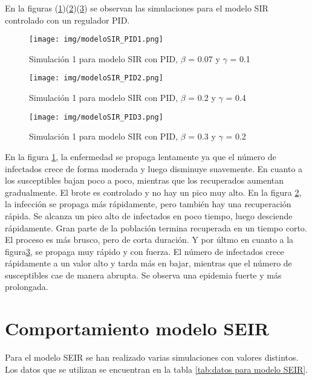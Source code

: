 En la figuras (\ref{fig:simu1pid})(\ref{fig:simu2pid})(\ref{fig:simu3pid}) se observan las simulaciones para el modelo SIR controlado con un regulador PID.

\begin{figure}[H]
    \centering
    \texttt{[image: img/modeloSIR\_PID1.png]}
    \caption{Simulación 1 para modelo SIR con PID, $\beta$ = 0.07 y $\gamma$ = 0.1}
    \label{fig:simu1pid}
    \vspace{0.5cm} %
\end{figure}

\begin{figure}[H]
    \centering
    \texttt{[image: img/modeloSIR\_PID2.png]}
    \caption{Simulación 1 para modelo SIR con PID, $\beta$ = 0.2 y $\gamma$ = 0.4}
    \label{fig:simu2pid}
    \vspace{0.5cm} %
\end{figure}

\begin{figure}[H]
    \centering
    \texttt{[image: img/modeloSIR\_PID3.png]}
    \caption{Simulación 1 para modelo SIR con PID, $\beta$ = 0.3 y $\gamma$ = 0.2}
    \label{fig:simu3pid}
    \vspace{0.5cm} %
\end{figure}

En la figura \ref{fig:simu1pid}, la enfermedad se propaga lentamente ya que el número de infectados crece de forma moderada y luego disminuye suavemente. En cuanto a los susceptibles bajan poco a poco, mientras que los recuperados aumentan gradualmente. El brote es controlado y no hay un pico muy alto. En la figura \ref{fig:simu2pid}, la infección se propaga más rápidamente, pero también hay una recuperación rápida. Se alcanza un pico alto de infectados en poco tiempo, luego desciende rápidamente.
Gran parte de la población termina recuperada en un tiempo corto. El proceso es más brusco, pero de corta duración. Y por últmo en cuanto a la figura\ref{fig:simu3pid}, se propaga muy rápido y con fuerza. El número de infectados crece rápidamente a un valor alto y tarda más en bajar, mientras que el número de susceptibles cae de manera abrupta. Se observa una epidemia fuerte y más prolongada.


\section{Comportamiento modelo SEIR}
Para el modelo SEIR se han realizado varias simulaciones con valores distintos. Los datos que se utilizan se encuentran en la tabla \ref{tab:datos para modelo SEIR}.

